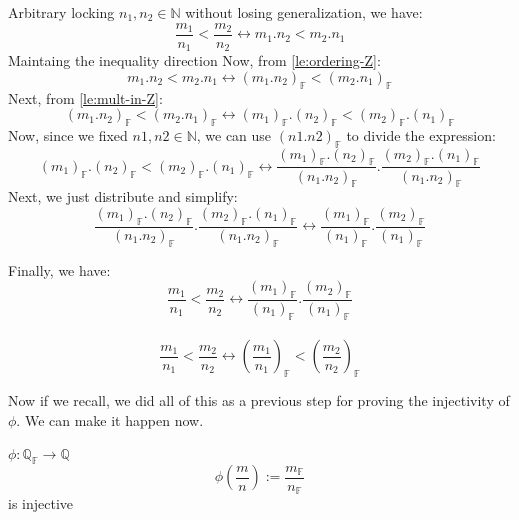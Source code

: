 \begin{bookproof}
Arbitrary locking $n_1, n_2 \in \mathbb{N}$ without losing generalization, we have:
$$\frac{m_1}{n_1} < \frac{m_2}{n_2} \leftrightarrow m_1.n_2 < m_2.n_1$$
Maintaing the inequality direction
Now, from \cref{le:ordering-Z}:
$$m_1.n_2 < m_2.n_1 \leftrightarrow (m_1.n_2)_\mathbb{F} < (m_2.n_1)_\mathbb{F}$$
Next, from \cref{le:mult-in-Z}:
$$(m_1.n_2)_\mathbb{F} < (m_2.n_1)_\mathbb{F} \leftrightarrow (m_1)_\mathbb{F}.(n_2)_\mathbb{F} < (m_2)_\mathbb{F}.(n_1)_\mathbb{F}$$
Now, since we fixed $n1, n2 \in \mathbb{N}$, we can use $(n1.n2)_\mathbb{F}$ to divide the expression:
$$(m_1)_\mathbb{F}.(n_2)_\mathbb{F} < (m_2)_\mathbb{F}.(n_1)_\mathbb{F} \leftrightarrow \frac{(m_1)_\mathbb{F}.(n_2)_\mathbb{F}}{(n_1.n_2)_\mathbb{F}} . \frac{(m_2)_\mathbb{F}.(n_1)_\mathbb{F}}{(n_1.n_2)_\mathbb{F}}$$
Next, we just distribute and simplify:
$$\frac{(m_1)_\mathbb{F}.(n_2)_\mathbb{F}}{(n_1.n_2)_\mathbb{F}} . \frac{(m_2)_\mathbb{F}.(n_1)_\mathbb{F}}{(n_1.n_2)_\mathbb{F}} \leftrightarrow \frac{(m_1)_\mathbb{F}}{(n_1)_\mathbb{F}} . \frac{(m_2)_\mathbb{F}}{(n_1)_\mathbb{F}}$$

Finally, we have:
$$\frac{m_1}{n_1} < \frac{m_2}{n_2} \leftrightarrow \frac{(m_1)_\mathbb{F}}{(n_1)_\mathbb{F}} . \frac{(m_2)_\mathbb{F}}{(n_1)_\mathbb{F}}$$
\\
$$\frac{m_1}{n_1} < \frac{m_2}{n_2} \leftrightarrow (\frac{m_1}{n_1})_\mathbb{F} < (\frac{m_2}{n_2})_\mathbb{F}$$
\end{bookproof}

Now if we recall, we did all of this as a previous step for proving the injectivity of $\phi$. We can make it happen now.

\begin{lemma}\label{le:phi-injective}
$\phi: \mathbb{Q_F} \rightarrow \mathbb{Q}$
$$\phi(\frac{m}{n}) := \frac{m_\mathbb{F}}{n_\mathbb{F}}$$ is injective
\end{lemma}

